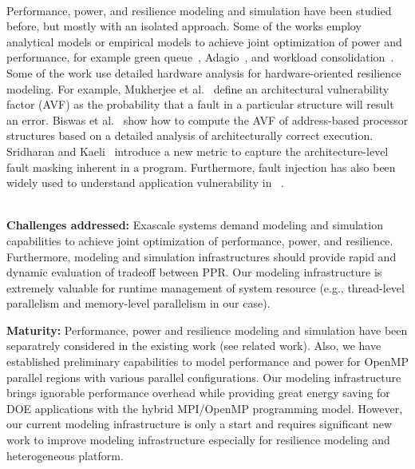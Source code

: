 \documentclass{article}  %
\begin{document}
\vspace{10pt}

   \\
Performance, power, and resilience modeling and simulation have been studied before, but mostly with
an isolated approach. Some of the works employ analytical models or empirical models
to achieve joint optimization of power and performance, 
for example green queue~\cite{sdscpower_hppac12, sdscpower_ccpe12, sdscpower_cgc12}, 
Adagio~\cite{rountree_sc07, rountree_ics09}, and workload consolidation~\cite{taskconsolidation_ipdps10, gpusolidation_srmpds11}.
Some of the work use detailed hardware analysis for hardware-oriented resilience modeling. 
For example, Mukherjee et al.~\cite{avf_micro03} define an architectural vulnerability factor
(AVF) as the probability that a fault in a particular structure will result an error. Biswas et al.~\cite{avf_isca05} show how to compute the
AVF of address-based processor structures based on a detailed analysis of architecturally correct execution.
Sridharan and Kaeli~\cite{pvf_selse10, pvf_hpca09} introduce a new metric to capture the architecture-level fault masking inherent in a
program. Furthermore, fault injection has also been widely used to understand application vulnerability in 
~\cite{li:2012:classifying, multigrid_ics12, fj_asplos12, fj_dns12, lanl_fi_europar11}.
\vspace{10pt}

   \\
\textbf{Challenges addressed:} 
Exascale systems demand modeling and simulation capabilities to achieve joint optimization of 
performance, power, and resilience. Furthermore, modeling and simulation infrastructures should
provide rapid and dynamic evaluation of tradeoff between PPR. Our modeling infrastructure is extremely
valuable for runtime management of system resource (e.g., thread-level parallelism and  
memory-level parallelism in our case).

\textbf{Maturity:} 
Performance, power and resilience modeling and simulation have been separatrely considered in the
existing work (see related work).
Also, we have established preliminary capabilities to model performance and power for OpenMP parallel 
regions with various parallel configurations. Our modeling infrastructure brings ignorable 
performance overhead while providing great energy saving for DOE applications with 
the hybrid MPI/OpenMP programming model.
However, our current modeling infrastructure is only a start and
requires significant new work to improve modeling infrastructure
especially for resilience modeling and heterogeneous platform. 
\end{document}
